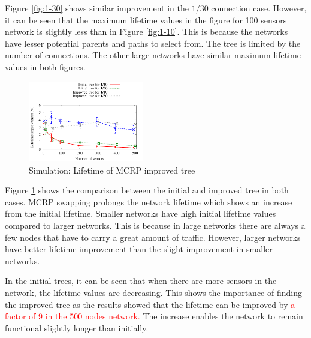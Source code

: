 Figure \ref{fig:1-30} shows similar improvement in the $1/30$ connection case. However, it can be seen that the maximum lifetime values in the figure for 100 sensors network is slightly less than in Figure \ref{fig:1-10}. This is because the networks have lesser potential parents and paths to select from. The tree is limited by the number of connections. The other large networks have similar maximum lifetime values in both figures.

\begin{figure}
\centering
\includegraphics[width=0.45\textwidth]{figures/maxmin.pdf}
\caption{Simulation: Lifetime of MCRP improved tree}
\label{fig:nodes-maxmin}
\end{figure}

Figure \ref{fig:nodes-maxmin} shows the comparison between the initial and improved tree in both cases. MCRP swapping prolongs the network lifetime which shows an increase from the initial lifetime. Smaller networks have high initial lifetime values compared to larger networks.  This is because in large networks there are always a few nodes that have to carry a great amount of traffic.  However, larger networks have better lifetime improvement than the slight improvement in smaller networks.

In the initial trees, it can be seen that when there are more sensors in the network, the lifetime values are decreasing. This shows the importance of finding the improved tree as the results showed that the lifetime can be improved by \textcolor{red}{a factor of 9 in the 500 nodes network.}
The increase enables the network to remain functional slightly longer than initially. 

